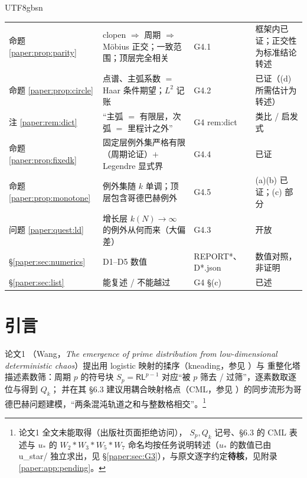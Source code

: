 \documentclass[11pt,a4paper]{article}
\newcommand{\Lsym}{\ensuremath{\mathsf{L}}}
\newcommand{\Rsym}{\ensuremath{\mathsf{R}}}
\newcommand{\ust}{u_{*}}               %
\theoremstyle{plain}
\theoremstyle{definition}
\begin{document}
\begin{CJK}{UTF8}{gbsn}
\begin{center}
\begin{tabular}{p{1.5cm}p{6.6cm}p{2.3cm}p{4.0cm}}
命题 \ref{paper:prop:parity} & clopen $\Rightarrow$ 周期 $\Rightarrow$ M\"obius 正交；一致范围；顶层完全相关 & G4.1 & 框架内已证；正交性为标准结论转述\\
命题 \ref{paper:prop:circle} & 点谱、主弧系数 $=$ Haar 条件期望；$L^2$ 记账 & G4.2 & 已证（(d) 所需估计为转述）\\
注 \ref{paper:rem:dict} & “主弧 $=$ 有限层，次弧 $=$ 里程计之外” & G4 rem:dict & 类比 / 启发式\\
命题 \ref{paper:prop:fixedk} & 固定层例外集严格有限（周期论证）$+$ Legendre 显式界 & G4.4 & 已证\\
命题 \ref{paper:prop:monotone} & 例外集随 $k$ 单调；顶层包含哥德巴赫例外 & G4.5 & (a)(b) 已证；(c) 部分\\
问题 \ref{paper:quest:ld} & 增长层 $k(N)\to\infty$ 的例外从何而来（大偏差） & G4.3 & 开放\\
\S\ref{paper:sec:numerics} & D1--D5 数值 & REPORT*、D*.json & 数值对照，非证明\\
\S\ref{paper:sec:list} & 能复述 / 不能越过 & G4 \S(c) & 已述\\
\hline
\end{tabular}
\end{center}

\section{引言}\label{paper:sec:intro}

论文1 \cite{Wang26}（Wang，\emph{The emergence of prime distribution from low-dimensional deterministic chaos}）提出用 logistic 映射的揉序（kneading，参见 \cite{MSS73}）与
重整化塔描述素数筛：周期 $p$ 的符号块 $S_p=\Rsym\Lsym^{p-1}$ 对应“被 $p$ 筛去 / 过筛”，逐素数取逐位与得到 $Q_k$；
并在其 \S6.3 建议用耦合映射格点（CML，参见 \cite{Kan84}）的同步流形为哥德巴赫问题建模，“两条混沌轨道之和与整数格相交”。\footnote{论文1 全文未能取得（出版社页面拒绝访问），
$S_p,Q_k$ 记号、\S6.3 的 CML 表述与 $\ust$ 的 $W_2*W_3*W_5*W_7$ 命名均按任务说明转述（$\ust$ 的数值已由 u\_star/ 独立求出，见 \S\ref{paper:sec:G3}），与原文逐字约定\textbf{待核}，见附录 \ref{paper:app:pending}。}


\end{CJK}
\end{document}
